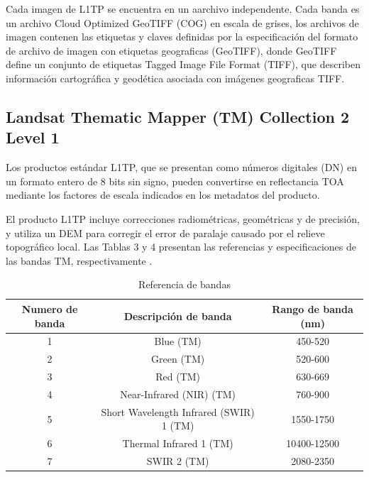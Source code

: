 	Cada imagen de L1TP se encuentra en un aarchivo independente. Cada banda es un archivo Cloud Optimized GeoTIFF (COG) en escala de grises, los archivos de imagen contenen las etiquetas y claves definidas por la especificación del formato de archivo de imagen con etiquetas geograficas (GeoTIFF), donde GeoTIFF define un conjunto de etiquetas Tagged Image File Format (TIFF), que describen información cartográfica y geodética asociada con imágenes geograficas TIFF. 
	
	\subsection{Landsat Thematic Mapper (TM) Collection 2 Level 1}
	
	Los productos estándar L1TP, que se presentan como números digitales (DN) en un formato entero de 8 bits sin signo, pueden convertirse en reflectancia TOA mediante los factores de escala indicados en los metadatos del producto.
	
	El producto L1TP incluye correcciones radiométricas, geométricas y de precisión, y utiliza un DEM para corregir el error de paralaje causado por el relieve topográfico local. Las Tablas 3 y 4 presentan las referencias y especificaciones de las bandas TM, respectivamente \parencite{landsat8}.
	
	
	\begin{table}[h!]
		\centering
		\begin{tabular}{|c|c|c|}
			\hline
			\textbf{Numero de banda} & \textbf{Descripción de banda} &\textbf{Rango de banda (nm)}\\
			\hline
			1 & Blue (TM) & 450-520\\
			2 & Green (TM) & 520-600 \\
			3 & Red (TM) & 630-669 \\
			4 & Near-Infrared (NIR) (TM) & 760-900 \\
			5 & Short Wavelength Infrared (SWIR) 1
			(TM) & 1550-1750 \\
			6 & Thermal Infrared 1 (TM)& 10400-12500 \\
			7 & SWIR 2 (TM) & 2080-2350 \\
			
			
			\hline
		\end{tabular}
		\caption{Referencia de bandas}
		\label{tabla2.4}
	\end{table}
	
